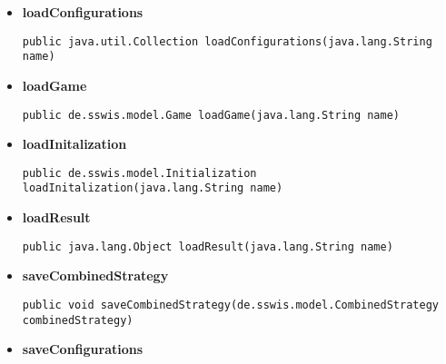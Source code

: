 {{{{{\begin{itemize}
{\begin{lstlisting}[frame=none]
public de.sswis.model.CombinedStrategy loadCombinedStrategy(java.lang.String name)\end{lstlisting} %
}%
\item{ 
\hypertarget{de.sswis.controller.FileManager.loadConfigurations(java.lang.String)}{{\bf  loadConfigurations}\\}
\begin{lstlisting}[frame=none]
public java.util.Collection loadConfigurations(java.lang.String name)\end{lstlisting} %
}%
\item{ 
\hypertarget{de.sswis.controller.FileManager.loadGame(java.lang.String)}{{\bf  loadGame}\\}
\begin{lstlisting}[frame=none]
public de.sswis.model.Game loadGame(java.lang.String name)\end{lstlisting} %
}%
\item{ 
\hypertarget{de.sswis.controller.FileManager.loadInitalization(java.lang.String)}{{\bf  loadInitalization}\\}
\begin{lstlisting}[frame=none]
public de.sswis.model.Initialization loadInitalization(java.lang.String name)\end{lstlisting} %
}%
\item{ 
\hypertarget{de.sswis.controller.FileManager.loadResult(java.lang.String)}{{\bf  loadResult}\\}
\begin{lstlisting}[frame=none]
public java.lang.Object loadResult(java.lang.String name)\end{lstlisting} %
}%
\item{ 
\hypertarget{de.sswis.controller.FileManager.saveCombinedStrategy(de.sswis.model.CombinedStrategy)}{{\bf  saveCombinedStrategy}\\}
\begin{lstlisting}[frame=none]
public void saveCombinedStrategy(de.sswis.model.CombinedStrategy combinedStrategy)\end{lstlisting} %
}%
\item{ 
\hypertarget{de.sswis.controller.FileManager.saveConfigurations(java.util.Collection)}{{\bf  saveConfigurations}\\}
}
\end{itemize}}}}}}

